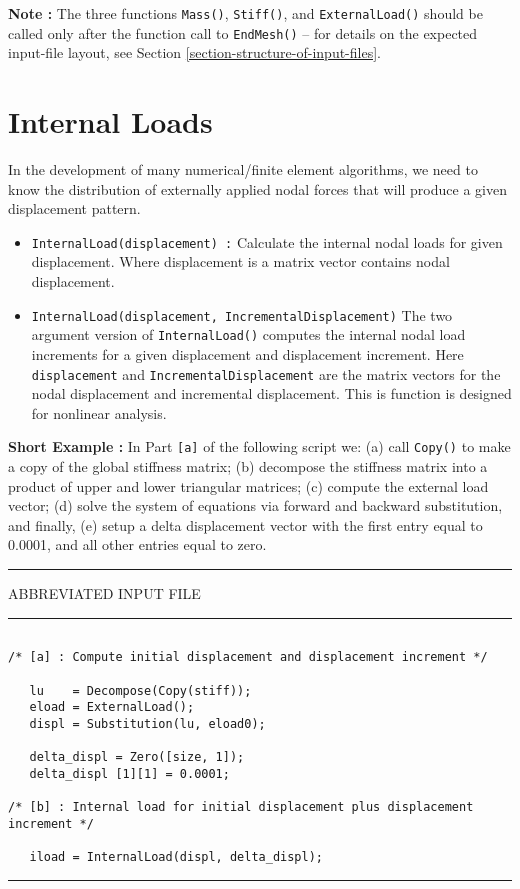 \vspace{0.15 in}\noindent
{\bf Note :} The three functions {\tt Mass()}, {\tt Stiff()}, and {\tt ExternalLoad()}
should be called only after the function call to {\tt EndMesh()} -- for details
on the expected input-file layout, see Section \ref{section-structure-of-input-files}.

\section{Internal Loads}

\vspace{0.15 in}\noindent
In the development of many numerical/finite element algorithms, we need
to know the distribution of externally applied nodal forces that will
produce a given displacement pattern. 

\begin{itemize}
\item{\tt InternalLoad(displacement) :}
Calculate the internal nodal loads for given displacement. Where
displacement is a matrix vector contains nodal displacement.

\item{\tt InternalLoad(displacement, IncrementalDisplacement)}
The two argument version of {\tt InternalLoad()} computes the
internal nodal load increments for a given displacement and displacement increment.
Here {\tt displacement} and {\tt IncrementalDisplacement} are the matrix vectors
for the nodal displacement and incremental displacement.
This is function is designed for nonlinear analysis.
\end{itemize}

\vspace{0.15 in}\noindent
{\bf Short Example :} In Part {\tt [a]} of the following script we:
(a) call {\tt Copy()} to make a copy of the global stiffness matrix;
(b) decompose the stiffness matrix into a product of upper and lower triangular matrices;
(c) compute the external load vector;
(d) solve the system of equations via forward and backward substitution, and finally,
(e) setup a delta displacement vector with the first entry equal to 0.0001,
and all other entries equal to zero.

\vspace{0.15 in}
\begin{footnotesize}
\noindent
{\rule{2.1 in}{0.035 in} ABBREVIATED INPUT FILE \rule{2.1 in}{0.035 in} }
\begin{verbatim}

/* [a] : Compute initial displacement and displacement increment */

   lu    = Decompose(Copy(stiff));
   eload = ExternalLoad();
   displ = Substitution(lu, eload0);

   delta_displ = Zero([size, 1]);
   delta_displ [1][1] = 0.0001;

/* [b] : Internal load for initial displacement plus displacement increment */

   iload = InternalLoad(displ, delta_displ); 
\end{verbatim}
\rule{6.25 in}{0.035 in}
\end{footnotesize}

